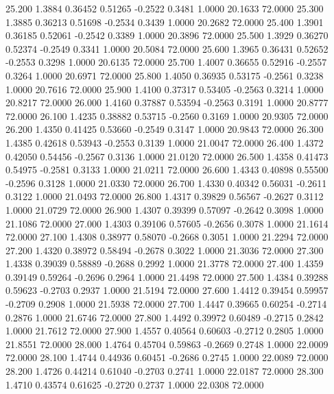  25.200   1.3884   0.36452   0.51265  -0.2522   0.3481   1.0000  20.1633  72.0000
  25.300   1.3885   0.36213   0.51698  -0.2534   0.3439   1.0000  20.2682  72.0000
  25.400   1.3901   0.36185   0.52061  -0.2542   0.3389   1.0000  20.3896  72.0000
  25.500   1.3929   0.36270   0.52374  -0.2549   0.3341   1.0000  20.5084  72.0000
  25.600   1.3965   0.36431   0.52652  -0.2553   0.3298   1.0000  20.6135  72.0000
  25.700   1.4007   0.36655   0.52916  -0.2557   0.3264   1.0000  20.6971  72.0000
  25.800   1.4050   0.36935   0.53175  -0.2561   0.3238   1.0000  20.7616  72.0000
  25.900   1.4100   0.37317   0.53405  -0.2563   0.3214   1.0000  20.8217  72.0000
  26.000   1.4160   0.37887   0.53594  -0.2563   0.3191   1.0000  20.8777  72.0000
  26.100   1.4235   0.38882   0.53715  -0.2560   0.3169   1.0000  20.9305  72.0000
  26.200   1.4350   0.41425   0.53660  -0.2549   0.3147   1.0000  20.9843  72.0000
  26.300   1.4385   0.42618   0.53943  -0.2553   0.3139   1.0000  21.0047  72.0000
  26.400   1.4372   0.42050   0.54456  -0.2567   0.3136   1.0000  21.0120  72.0000
  26.500   1.4358   0.41473   0.54975  -0.2581   0.3133   1.0000  21.0211  72.0000
  26.600   1.4343   0.40898   0.55500  -0.2596   0.3128   1.0000  21.0330  72.0000
  26.700   1.4330   0.40342   0.56031  -0.2611   0.3122   1.0000  21.0493  72.0000
  26.800   1.4317   0.39829   0.56567  -0.2627   0.3112   1.0000  21.0729  72.0000
  26.900   1.4307   0.39399   0.57097  -0.2642   0.3098   1.0000  21.1086  72.0000
  27.000   1.4303   0.39106   0.57605  -0.2656   0.3078   1.0000  21.1614  72.0000
  27.100   1.4308   0.38977   0.58070  -0.2668   0.3051   1.0000  21.2294  72.0000
  27.200   1.4320   0.38972   0.58494  -0.2678   0.3022   1.0000  21.3036  72.0000
  27.300   1.4338   0.39039   0.58889  -0.2688   0.2992   1.0000  21.3778  72.0000
  27.400   1.4359   0.39149   0.59264  -0.2696   0.2964   1.0000  21.4498  72.0000
  27.500   1.4384   0.39288   0.59623  -0.2703   0.2937   1.0000  21.5194  72.0000
  27.600   1.4412   0.39454   0.59957  -0.2709   0.2908   1.0000  21.5938  72.0000
  27.700   1.4447   0.39665   0.60254  -0.2714   0.2876   1.0000  21.6746  72.0000
  27.800   1.4492   0.39972   0.60489  -0.2715   0.2842   1.0000  21.7612  72.0000
  27.900   1.4557   0.40564   0.60603  -0.2712   0.2805   1.0000  21.8551  72.0000
  28.000   1.4764   0.45704   0.59863  -0.2669   0.2748   1.0000  22.0009  72.0000
  28.100   1.4744   0.44936   0.60451  -0.2686   0.2745   1.0000  22.0089  72.0000
  28.200   1.4726   0.44214   0.61040  -0.2703   0.2741   1.0000  22.0187  72.0000
  28.300   1.4710   0.43574   0.61625  -0.2720   0.2737   1.0000  22.0308  72.0000
